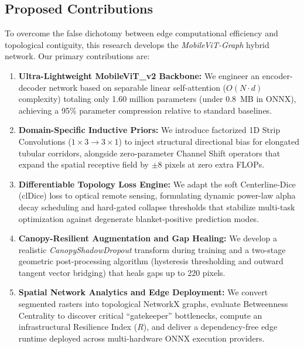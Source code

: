 \documentclass[conference]{IEEEtran}
\begin{document}
\subsection{Proposed Contributions}
To overcome the false dichotomy between edge computational efficiency and topological contiguity, this research develops the \textit{MobileViT-Graph} hybrid network. Our primary contributions are:
\begin{enumerate}
    \item \textbf{Ultra-Lightweight MobileViT\_v2 Backbone:} We engineer an encoder-decoder network based on separable linear self-attention ($O(N \cdot d)$ complexity) totaling only 1.60 million parameters (under 0.8~MB in ONNX), achieving a 95\% parameter compression relative to standard baselines.
    \item \textbf{Domain-Specific Inductive Priors:} We introduce factorized 1D Strip Convolutions ($1\times3 \to 3\times1$) to inject structural directional bias for elongated tubular corridors, alongside zero-parameter Channel Shift operators that expand the spatial receptive field by $\pm8$ pixels at zero extra FLOPs.
    \item \textbf{Differentiable Topology Loss Engine:} We adapt the soft Centerline-Dice (clDice) loss to optical remote sensing, formulating dynamic power-law alpha decay scheduling and hard-gated collapse thresholds that stabilize multi-task optimization against degenerate blanket-positive prediction modes.
    \item \textbf{Canopy-Resilient Augmentation and Gap Healing:} We develop a realistic \textit{CanopyShadowDropout} transform during training and a two-stage geometric post-processing algorithm (hysteresis thresholding and outward tangent vector bridging) that heals gaps up to 220 pixels.
    \item \textbf{Spatial Network Analytics and Edge Deployment:} We convert segmented rasters into topological NetworkX graphs, evaluate Betweenness Centrality to discover critical ``gatekeeper'' bottlenecks, compute an infrastructural Resilience Index ($R$), and deliver a dependency-free edge runtime deployed across multi-hardware ONNX execution providers.
\end{enumerate}
\end{document}
